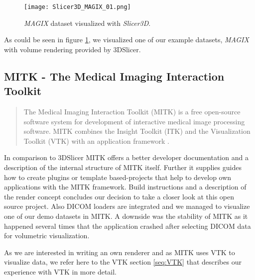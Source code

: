 
\begin{figure}[h]
	\centering
	\texttt{[image: Slicer3D\_MAGIX\_01.png]} \\
	\caption{ \emph{MAGIX}\cite{gimias_sampledata_2018} dataset visualized with \emph{Slicer3D}.}
	\label{fig:Slicer3D_MAGIX_01}
\end{figure}

As could be seen in figure \ref{fig:Slicer3D_MAGIX_01}, we visualized one of our example datasets, \emph{MAGIX} with volume rendering provided by 3DSlicer.


\subsection{MITK - The Medical Imaging Interaction Toolkit}

\blockquote{The Medical Imaging Interaction Toolkit (MITK) is a free open-source software system for development of interactive medical image processing software. MITK combines the Insight Toolkit (ITK) and the Visualization Toolkit (VTK) with an application framework \cite{MITK_2018}.}

In comparison to 3DSlicer MITK offers a better developer documentation and a description of the internal structure of MITK itself. Further it supplies guides how to create plugins or template based-projects that help to develop own applications with the MITK framework. Build instructions and a description of the render concept concludes our decision to take a closer look at this open source project.
Also DICOM loaders are integrated and we managed to visualize one of our demo datasets in MITK. A downside was the stability of MITK as it happened several times that the application crashed after selecting DICOM data for volumetric visualization.

As we are interested in writing an own renderer and as MITK uses VTK to visualize data, we refer here to the VTK section \ref{seq:VTK} that describes our experience with VTK in more detail.


